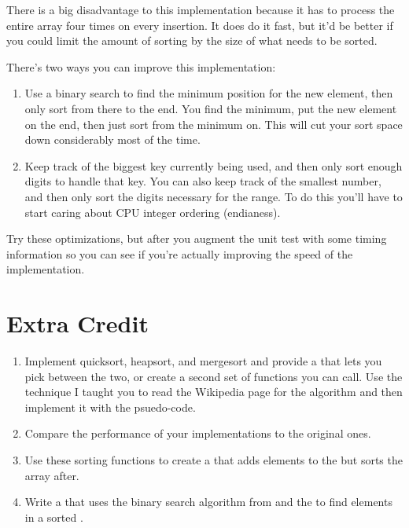 There is a big disadvantage to this implementation because it has to
process the entire array four times on every insertion.  It does do
it fast, but it'd be better if you could limit the amount of sorting
by the size of what needs to be sorted.

There's two ways you can improve this implementation:

\begin{enumerate}
\item Use a binary search to find the minimum position for the 
    new element, then only sort from there to the end.  You find the
    minimum, put the new element on the end, then just sort from
    the minimum on.   This will cut your sort space down 
    considerably most of the time.
\item Keep track of the biggest key currently being used, and then only
    sort enough digits to handle that key.  You can also keep track
    of the smallest number, and then only sort the digits necessary
    for the range.  To do this you'll have to start caring about
    CPU integer ordering (endianess).
\end{enumerate}

Try these optimizations, but after you augment the unit test with some
timing information so you can see if you're actually improving the
speed of the implementation.

\section{Extra Credit}

\begin{enumerate}
\item Implement quicksort, heapsort, and mergesort and provide a 
    that lets you pick between the two, or create a second set of functions 
    you can call.  Use the technique I taught you to read the Wikipedia page
    for the algorithm and then implement it with the psuedo-code.
\item Compare the performance of your implementations to the original ones.
\item Use these sorting functions to create a  that
    adds elements to the  but sorts the array after.
\item Write a  that uses the binary search algorithm from 
     and the  to find elements
    in a sorted .
\end{enumerate}

